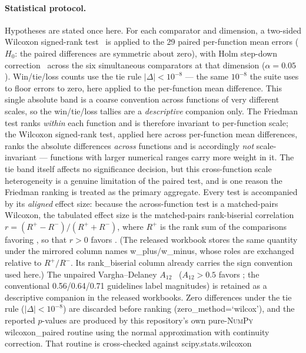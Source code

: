 \paragraph{Statistical protocol.}
Hypotheses are stated once here. For each comparator and dimension,
a two-sided Wilcoxon signed-rank test~\cite{wilcoxon1945individual}
is applied to the 29 paired per-function mean errors
($H_{0}$: the paired differences are symmetric about zero), with
Holm step-down correction~\cite{holm1979simple} across the
six simultaneous comparators at that dimension ($\alpha = 0.05$).
Win/tie/loss counts use the tie rule $|\Delta| < 10^{-8}$ --- the same
$10^{-8}$ the suite uses to floor errors to zero, here applied to the
per-function mean difference. This single absolute band is a coarse
convention across functions of very different scales, so the win/tie/loss
tallies are a \emph{descriptive} companion only. The Friedman test ranks
\emph{within} each function and is therefore invariant to per-function scale;
the Wilcoxon signed-rank test, applied here across per-function mean
differences, ranks the absolute differences \emph{across} functions and is
accordingly \emph{not} scale-invariant --- functions with larger numerical
ranges carry more weight in it. The tie band itself affects no significance
decision, but this cross-function scale heterogeneity is a genuine limitation
of the paired test, and is one reason the Friedman ranking is treated as the
primary aggregate. Every
test is accompanied by its \emph{aligned} effect size: because the
across-function test is a matched-pairs Wilcoxon, the tabulated effect size is
the matched-pairs rank-biserial correlation
$r = (R^{+} - R^{-})/(R^{+} + R^{-})$, where $R^{+}$ is the rank sum of the
comparisons favoring \dtgsk{}, so that $r > 0$ favors \dtgsk{}. (The released
workbook stores the same quantity under the mirrored column names
w\_plus/w\_minus, whose roles are exchanged relative to
$R^{+}/R^{-}$. Its rank\_biserial column already carries the sign
convention used here.) The
unpaired Vargha--Delaney $A_{12}$~\cite{vargha2000critique} ($A_{12} > 0.5$
favors \dtgsk{}; the conventional 0.56/0.64/0.71 guidelines label magnitudes)
is retained as a descriptive companion in the released workbooks. Zero differences under the tie rule
($|\Delta| < 10^{-8}$) are discarded before ranking
(zero\_method=`wilcox'), and the reported $p$-values are produced by
this repository's own pure-\textsc{NumPy} wilcoxon\_paired routine
using the normal approximation with continuity correction. That routine is
cross-checked against scipy.stats.wilcoxon
